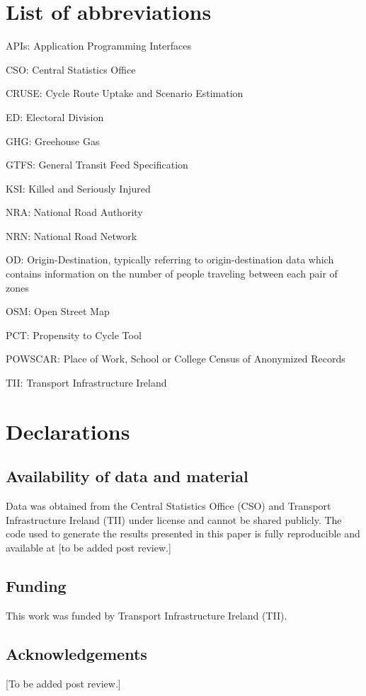 \documentclass[
  super,
  preprint,
  3p]{elsarticle}
\providecommand{\DIFaddbegin}{} %
\providecommand{\DIFaddend}{} %
\providecommand{\DIFdelbegin}{} %
\providecommand{\DIFdelend}{} %
\newcommand{\DIFscaledelfig}{0.5}
\newlength{\DIFdelgraphicswidth} %
\newlength{\DIFdelgraphicsheight} %
\newcommand{\DIFaddincludegraphics}[2][]{{\color{blue}\fbox{\DIFOincludegraphics[#1]{#2}}}} %
\newcommand{\DIFdelincludegraphics}[2][]{%
\sbox{\DIFdelgraphicsbox}{\DIFOincludegraphics[#1]{#2}}%
\settoboxwidth{\DIFdelgraphicswidth}{\DIFdelgraphicsbox} %
\settoboxtotalheight{\DIFdelgraphicsheight}{\DIFdelgraphicsbox} %
\scalebox{\DIFscaledelfig}{%
\parbox[b]{\DIFdelgraphicswidth}{\usebox{\DIFdelgraphicsbox}\\[-\baselineskip] \rule{\DIFdelgraphicswidth}{0em}}\llap{\resizebox{\DIFdelgraphicswidth}{\DIFdelgraphicsheight}{%
\setlength{\unitlength}{\DIFdelgraphicswidth}%
\begin{picture}(1,1)%
\thicklines\linethickness{2pt} %
{\color[rgb]{1,0,0}\put(0,0){\framebox(1,1){}}}%
{\color[rgb]{1,0,0}\put(0,0){\line( 1,1){1}}}%
{\color[rgb]{1,0,0}\put(0,1){\line(1,-1){1}}}%
\end{picture}%
}\hspace*{3pt}}} %
} %
\DeclareRobustCommand{\DIFaddbegin}{\DIFOaddbegin \let\includegraphics\DIFaddincludegraphics} %
\DeclareRobustCommand{\DIFaddend}{\DIFOaddend \let\includegraphics\DIFOincludegraphics} %
\DeclareRobustCommand{\DIFdelbegin}{\DIFOdelbegin \let\includegraphics\DIFdelincludegraphics} %
\DeclareRobustCommand{\DIFdelend}{\DIFOaddend \let\includegraphics\DIFOincludegraphics} %
\begin{document}
\section{List of abbreviations}\label{list-of-abbreviations}

APIs: Application Programming Interfaces

CSO: Central Statistics Office

CRUSE: Cycle Route Uptake and Scenario Estimation

ED: Electoral Division

GHG: Greehouse Gas

GTFS: General Transit Feed Specification

KSI: Killed and Seriously Injured

NRA: National Road Authority

NRN: National Road Network

OD: Origin-Destination, typically referring to origin-destination data
which contains information on the number of people traveling between
each pair of zones

OSM: Open Street Map

PCT: Propensity to Cycle Tool

POWSCAR: Place of Work, School or College Census of Anonymized Records

TII: Transport Infrastructure Ireland

\section{Declarations}\label{declarations}

\subsection*{Availability of data and
material}\label{availability-of-data-and-material}

Data was obtained from the Central Statistics Office (CSO) and Transport
Infrastructure Ireland (TII) under license and cannot be shared
publicly. The code used to generate the results presented in this paper
is fully reproducible and available at {[}to be added post review.{]}

\subsection*{Funding}\label{funding}

This work was funded by Transport Infrastructure Ireland (TII).

\subsection*{Acknowledgements}\label{acknowledgements}

{[}To be added post review.{]}


  \DIFdelbegin %
\DIFdelend \DIFaddbegin 
\DIFaddend 
\end{document}
